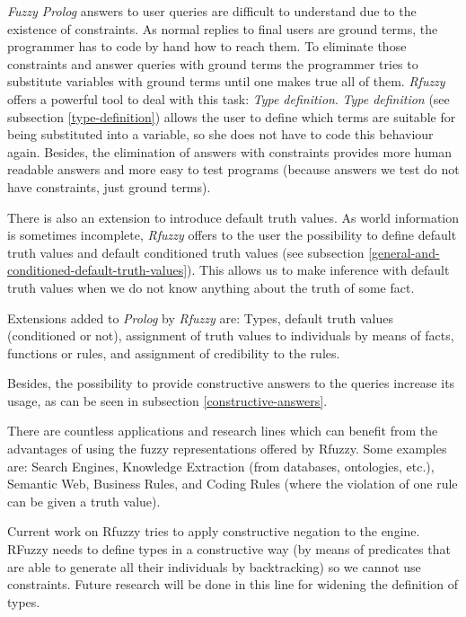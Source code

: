 \documentclass[runningheads,a4paper]{llncs}
\begin{document}
{\it Fuzzy Prolog} answers to user queries are difficult to 
understand due to the existence of constraints. 
As normal replies to final users are ground terms, 
the programmer has to code by hand how to reach them.
To eliminate those constraints and answer queries with 
ground terms the programmer tries to substitute variables 
with ground terms until one makes true all of them.
{\it Rfuzzy} offers a powerful tool to deal with this 
task: {\it Type definition}. 
{\it Type definition} (see subsection \ref{type-definition})
allows the user to define which terms are suitable for 
being substituted into a variable, so she does not have to 
code this behaviour again. 
Besides, the elimination of answers with constraints provides 
more human readable answers and more easy to test programs
(because answers we test do not have constraints, 
just ground terms). 

There is also an extension to introduce default truth values. 
As world information is sometimes incomplete, {\it Rfuzzy}
offers to the user the possibility to define default truth 
values and default conditioned truth values (see subsection 
\ref{general-and-conditioned-default-truth-values}).
This allows us to make inference with default truth values
when we do not know anything about the truth of some fact.

Extensions added to {\it Prolog} by {\it Rfuzzy} are:
Types, default truth values (conditioned or not),
assignment of truth values to individuals by means of facts, 
functions or rules, 
and assignment of credibility to the rules.

Besides, the possibility to provide constructive answers 
to the queries increase its usage, as can be seen in 
subsection \ref{constructive-answers}. 

There are countless applications and research lines which can benefit 
from the advantages of using the fuzzy representations offered
by Rfuzzy. Some examples are: 
Search Engines, Knowledge Extraction (from databases, ontologies, etc.), 
Semantic Web, Business Rules, and
Coding Rules (where the violation of one rule can be given a truth value).

Current work on Rfuzzy tries to apply constructive negation to the
engine.  RFuzzy needs to define types in a constructive way 
(by means of predicates that are able to generate all their 
individuals by backtracking) 
so we cannot use constraints.
Future research will be done in this line for widening the 
definition of types.
\end{document}
